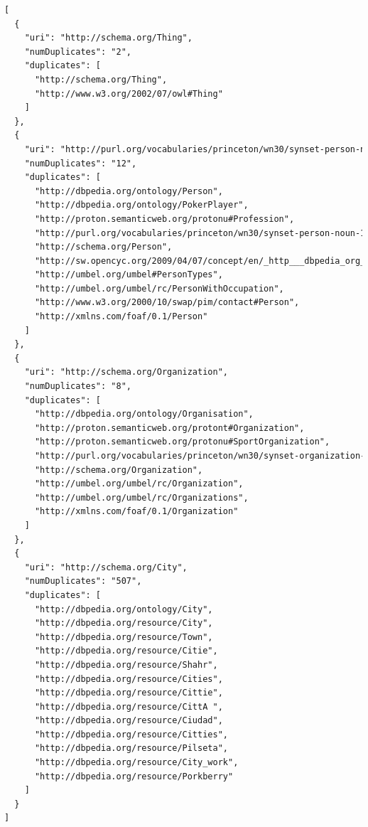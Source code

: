 \documentclass[spanish]{llncs}   %
\begin{document}
\begin{lstlisting}[language=HTML, breaklines, caption={Equivalencias de sameAs.org para Schema.org.}, captionpos=b]
    [
  {
    "uri": "http://schema.org/Thing",
    "numDuplicates": "2",
    "duplicates": [
      "http://schema.org/Thing",
      "http://www.w3.org/2002/07/owl#Thing"
    ]
  },
  {
    "uri": "http://purl.org/vocabularies/princeton/wn30/synset-person-noun-1",
    "numDuplicates": "12",
    "duplicates": [
      "http://dbpedia.org/ontology/Person",
      "http://dbpedia.org/ontology/PokerPlayer",
      "http://proton.semanticweb.org/protonu#Profession",
      "http://purl.org/vocabularies/princeton/wn30/synset-person-noun-1",
      "http://schema.org/Person",
      "http://sw.opencyc.org/2009/04/07/concept/en/_http___dbpedia_org_ontology_PokerPlayer_",
      "http://umbel.org/umbel#PersonTypes",
      "http://umbel.org/umbel/rc/PersonWithOccupation",
      "http://www.w3.org/2000/10/swap/pim/contact#Person",
      "http://xmlns.com/foaf/0.1/Person"
    ]
  },
  {
    "uri": "http://schema.org/Organization",
    "numDuplicates": "8",
    "duplicates": [
      "http://dbpedia.org/ontology/Organisation",
      "http://proton.semanticweb.org/protont#Organization",
      "http://proton.semanticweb.org/protonu#SportOrganization",
      "http://purl.org/vocabularies/princeton/wn30/synset-organization-noun-1",
      "http://schema.org/Organization",
      "http://umbel.org/umbel/rc/Organization",
      "http://umbel.org/umbel/rc/Organizations",
      "http://xmlns.com/foaf/0.1/Organization"
    ]
  },
  {
    "uri": "http://schema.org/City",
    "numDuplicates": "507",
    "duplicates": [
      "http://dbpedia.org/ontology/City",
      "http://dbpedia.org/resource/City",
      "http://dbpedia.org/resource/Town",
      "http://dbpedia.org/resource/Citie",
      "http://dbpedia.org/resource/Shahr",
      "http://dbpedia.org/resource/Cities",
      "http://dbpedia.org/resource/Cittie",
      "http://dbpedia.org/resource/CittA ",
      "http://dbpedia.org/resource/Ciudad",
      "http://dbpedia.org/resource/Citties",
      "http://dbpedia.org/resource/Pilseta",
      "http://dbpedia.org/resource/City_work",
      "http://dbpedia.org/resource/Porkberry"
    ]
  }
]
\end{lstlisting}
\end{document}
